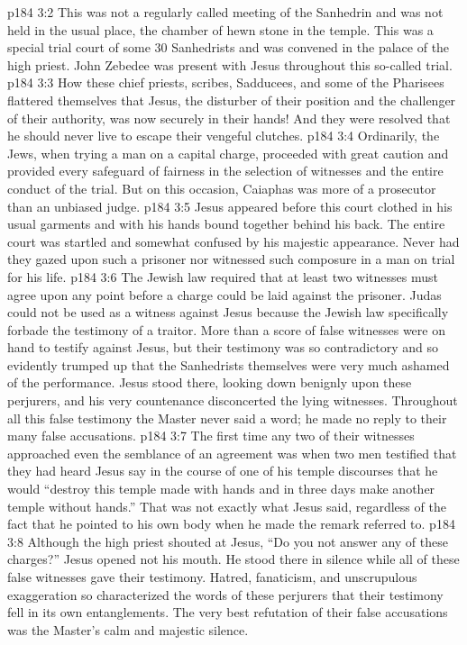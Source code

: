 \vs p184 3:2 This was not a regularly called meeting of the Sanhedrin and was not held in the usual place, the chamber of hewn stone in the temple. This was a special trial court of some 30 Sanhedrists and was convened in the palace of the high priest. John Zebedee was present with Jesus throughout this so\hyp{}called trial.
\vs p184 3:3 How these chief priests, scribes, Sadducees, and some of the Pharisees flattered themselves that Jesus, the disturber of their position and the challenger of their authority, was now securely in their hands! And they were resolved that he should never live to escape their vengeful clutches.
\vs p184 3:4 Ordinarily, the Jews, when trying a man on a capital charge, proceeded with great caution and provided every safeguard of fairness in the selection of witnesses and the entire conduct of the trial. But on this occasion, Caiaphas was more of a prosecutor than an unbiased judge.
\vs p184 3:5 \pc Jesus appeared before this court clothed in his usual garments and with his hands bound together behind his back. The entire court was startled and somewhat confused by his majestic appearance. Never had they gazed upon such a prisoner nor witnessed such composure in a man on trial for his life.
\vs p184 3:6 \pc The Jewish law required that at least two witnesses must agree upon any point before a charge could be laid against the prisoner. Judas could not be used as a witness against Jesus because the Jewish law specifically forbade the testimony of a traitor. More than a score of false witnesses were on hand to testify against Jesus, but their testimony was so contradictory and so evidently trumped up that the Sanhedrists themselves were very much ashamed of the performance. Jesus stood there, looking down benignly upon these perjurers, and his very countenance disconcerted the lying witnesses. Throughout all this false testimony the Master never said a word; he made no reply to their many false accusations.
\vs p184 3:7 The first time any two of their witnesses approached even the semblance of an agreement was when two men testified that they had heard Jesus say in the course of one of his temple discourses that he would “destroy this temple made with hands and in three days make another temple without hands.” That was not exactly what Jesus said, regardless of the fact that he pointed to his own body when he made the remark referred to.
\vs p184 3:8 Although the high priest shouted at Jesus, “Do you not answer any of these charges?” Jesus opened not his mouth. He stood there in silence while all of these false witnesses gave their testimony. Hatred, fanaticism, and unscrupulous exaggeration so characterized the words of these perjurers that their testimony fell in its own entanglements. The very best refutation of their false accusations was the Master’s calm and majestic silence.
